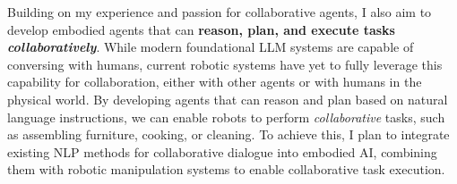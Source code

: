 \documentclass[10pt]{article}
\newcommand{\statement}[1]{\medskip\noindent
  \textcolor{black}{\textbf{#1}}\space
}
\newif\ifcomments
\newcommand{\todo}[1]{\ifcomments\textcolor{red}{TODO: #1}\fi}
\begin{document}
\noindent Building on my experience and passion for collaborative agents, I also aim to develop embodied agents that can \textbf{reason, plan, and execute tasks \textit{collaboratively}}. While modern foundational LLM systems are capable of conversing with humans, current robotic systems have yet to fully leverage this capability for collaboration, either with other agents or with humans in the physical world. By developing agents that can reason and plan based on natural language instructions, we can enable robots to perform \textit{collaborative} tasks, such as assembling furniture, cooking, or cleaning. To achieve this, I plan to integrate existing NLP methods for collaborative dialogue into embodied AI, combining them with robotic manipulation systems to enable collaborative task execution.

\statement{\todo{Why School}}
\end{document}
